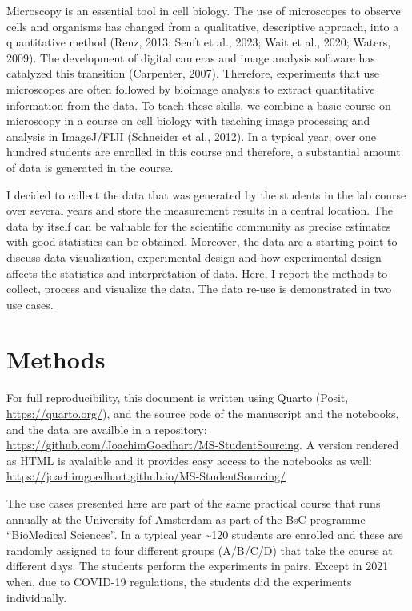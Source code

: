 \documentclass[
]{agujournal2019}
\begin{document}
Microscopy is an essential tool in cell biology. The use of microscopes
to observe cells and organisms has changed from a qualitative,
descriptive approach, into a quantitative method (Renz, 2013; Senft et
al., 2023; Wait et al., 2020; Waters, 2009). The development of digital
cameras and image analysis software has catalyzed this transition
(Carpenter, 2007). Therefore, experiments that use microscopes are often
followed by bioimage analysis to extract quantitative information from
the data. To teach these skills, we combine a basic course on microscopy
in a course on cell biology with teaching image processing and analysis
in ImageJ/FIJI (Schneider et al., 2012). In a typical year, over one
hundred students are enrolled in this course and therefore, a
substantial amount of data is generated in the course.

I decided to collect the data that was generated by the students in the
lab course over several years and store the measurement results in a
central location. The data by itself can be valuable for the scientific
community as precise estimates with good statistics can be obtained.
Moreover, the data are a starting point to discuss data visualization,
experimental design and how experimental design affects the statistics
and interpretation of data. Here, I report the methods to collect,
process and visualize the data. The data re-use is demonstrated in two
use cases.

\hypertarget{sec-data-methods}{%
\section*{Methods}\label{sec-data-methods}}

For full reproducibility, this document is written using Quarto (Posit,
\url{https://quarto.org/}), and the source code of the manuscript and
the notebooks, and the data are availble in a repository:
\url{https://github.com/JoachimGoedhart/MS-StudentSourcing}. A version
rendered as HTML is avalaible and it provides easy access to the
notebooks as well:
\url{https://joachimgoedhart.github.io/MS-StudentSourcing/}

The use cases presented here are part of the same practical course that
runs annually at the University fof Amsterdam as part of the BsC
programme ``BioMedical Sciences''. In a typical year \textasciitilde120
students are enrolled and these are randomly assigned to four different
groups (A/B/C/D) that take the course at different days. The students
perform the experiments in pairs. Except in 2021 when, due to COVID-19
regulations, the students did the experiments individually.
\end{document}
